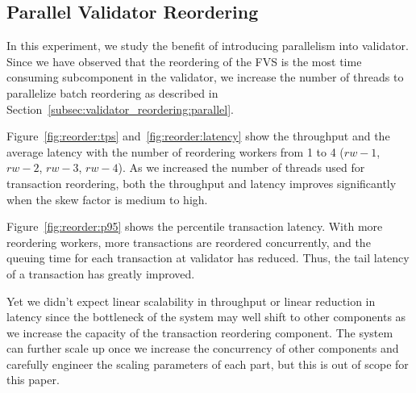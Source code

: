\subsection{Parallel Validator Reordering}
In this experiment, we study the benefit of introducing parallelism into validator. Since we have observed that the reordering of the FVS is the most time consuming subcomponent in the validator, we increase the number of threads to parallelize batch reordering as described in Section~\ref{subsec:validator_reordering:parallel}. 

Figure~\ref{fig:reorder:tps} and~\ref{fig:reorder:latency} show the throughput
and the average latency with the number of reordering workers from 1 to 4
($rw-1$, $rw-2$, $rw-3$, $rw-4$). As we increased the number of threads used for
transaction reordering, both the throughput and latency improves significantly when the skew factor is medium to high.

Figure~\ref{fig:reorder:p95} shows the percentile transaction latency. With more reordering workers, more transactions are reordered concurrently, and the queuing time for each transaction at validator has reduced. Thus, the tail latency of a transaction has greatly improved. 

Yet we didn't expect linear scalability in throughput or linear reduction in
latency since the bottleneck of the system may well shift to other
components as we increase the capacity of the transaction reordering
component. The system can further scale up once we increase the concurrency
of other components and carefully engineer the scaling parameters of each part,
but this is out of scope for this paper.
